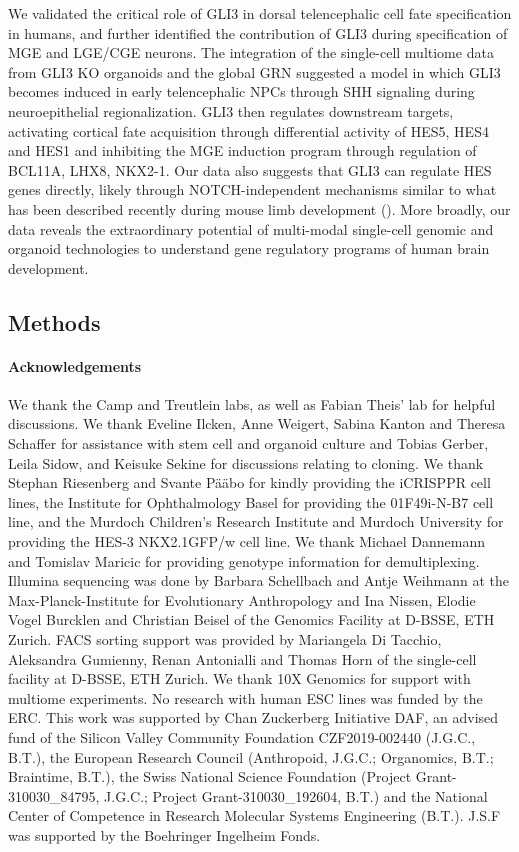 We validated the critical role of GLI3 in dorsal telencephalic cell fate specification in humans, and further identified the contribution of GLI3 during specification of MGE and LGE/CGE neurons. The integration of the single-cell multiome data from GLI3 KO organoids and the global GRN suggested a model in which GLI3 becomes induced in early telencephalic NPCs through SHH signaling during neuroepithelial regionalization. GLI3 then regulates downstream targets, activating cortical fate acquisition through differential activity of HES5, HES4 and HES1 and inhibiting the MGE induction program through regulation of BCL11A, LHX8, NKX2-1. Our data also suggests that GLI3 can regulate HES genes directly, likely through NOTCH-independent mechanisms similar to what has been described recently during mouse limb development (\cite{sharma_hes1_2021}). More broadly, our data reveals the extraordinary potential of multi-modal single-cell genomic and organoid technologies to understand gene regulatory programs of human brain development.


\subsection{Methods}

\paragraph{Acknowledgements}
We thank the Camp and Treutlein labs, as well as Fabian Theis’ lab for helpful discussions. We thank Eveline Ilcken, Anne Weigert, Sabina Kanton and Theresa Schaffer for assistance with stem cell and organoid culture and Tobias Gerber, Leila Sidow, and Keisuke Sekine for discussions relating to cloning. We thank Stephan Riesenberg and Svante Pääbo for kindly providing the iCRISPPR cell lines, the Institute for Ophthalmology Basel for providing the 01F49i-N-B7 cell line, and the Murdoch Children's Research Institute and Murdoch University for providing the HES-3 NKX2.1GFP/w cell line. We thank Michael Dannemann and Tomislav Maricic for providing genotype information for demultiplexing. Illumina sequencing was done by Barbara Schellbach and Antje Weihmann at the Max-Planck-Institute for Evolutionary Anthropology and Ina Nissen, Elodie Vogel Burcklen and Christian Beisel of the Genomics Facility at D-BSSE, ETH Zurich. FACS sorting support was provided by Mariangela Di Tacchio, Aleksandra Gumienny, Renan Antonialli and Thomas Horn of the single-cell facility at D-BSSE, ETH Zurich. We thank 10X Genomics for support with multiome experiments. No research with human ESC lines was funded by the ERC. This work was supported by Chan Zuckerberg Initiative DAF, an advised fund of the Silicon Valley Community Foundation CZF2019-002440 (J.G.C., B.T.), the European Research Council (Anthropoid, J.G.C.; Organomics, B.T.; Braintime, B.T.), the Swiss National Science Foundation (Project Grant-310030\_84795, J.G.C.; Project Grant-310030\_192604, B.T.) and the National Center of Competence in Research Molecular Systems Engineering (B.T.). J.S.F was supported by the Boehringer Ingelheim Fonds.
 
